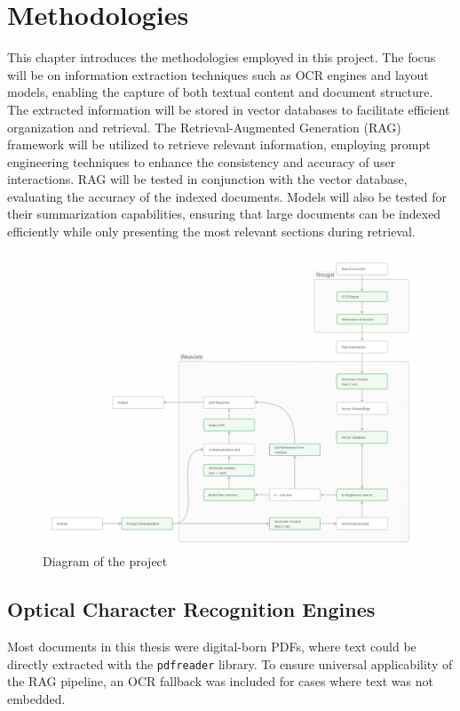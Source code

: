 \chapter{Methodologies}
\label{chapter:Methodologies}
This chapter introduces the methodologies employed in this project. The focus will be on information extraction techniques such as OCR engines and layout models, enabling the capture of both textual content and document structure. The extracted information will be stored in vector databases to facilitate efficient organization and retrieval. The Retrieval-Augmented Generation (RAG) framework will be utilized to retrieve relevant information, employing prompt engineering techniques to enhance the consistency and accuracy of user interactions. RAG will be tested in conjunction with the vector database, evaluating the accuracy of the indexed documents. Models will also be tested for their summarization capabilities, ensuring that large documents can be indexed efficiently while only presenting the most relevant sections during retrieval.
\begin{figure}[H]
    \centering
    \includegraphics[width=1\linewidth]{Figures/graph_methods.png}
    \caption{Diagram of the project}
    \label{fig:methodology}
\end{figure}

\section{Optical Character Recognition Engines}
\label{sec:ocr}
Most documents in this thesis were digital-born PDFs, where text could be directly extracted with the \texttt{pdfreader} library. To ensure universal applicability of the RAG pipeline, an OCR fallback was included for cases where text was not embedded. 


